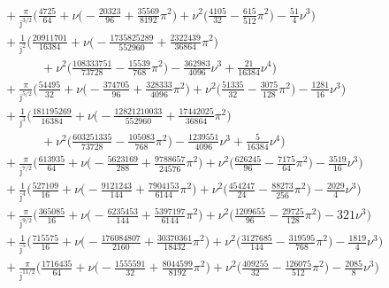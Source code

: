 \documentclass[prd,superscriptaddress,preprintnumbers,tightenlines,nofootinbib, eqsecnum]{revtex4-2}
\newcommand{\nn}{\nonumber}
\begin{document}
\begin{align}
&\qquad\quad + \frac{\pi}{\bar{\jmath}^{3/2}}\Bigg(\frac{4725}{64} + \nu\bigg(-\frac{20323}{96} + \frac{35569}{8192}\pi^{2}\bigg) + \nu^{2}\bigg(\frac{4105}{32} - \frac{615}{512}\pi^{2}\bigg) - \frac{51}{4}\nu^{3}\Bigg) \nn \\
&\qquad\quad + \frac{1}{\bar{\jmath}^{2}}\Bigg(\frac{20911701}{16384} + \nu\bigg(-\frac{1735825289}{552960} + \frac{2322439}{36864}\pi^{2}\bigg) \nn \\
&\qquad\qquad\qquad + \nu^{2}\bigg(\frac{108333751}{73728} - \frac{15539}{768}\pi^{2}\bigg) - \frac{362983}{4096}\nu^{3} + \frac{21}{16384}\nu^{4}\Bigg) \nn \\
&\qquad\quad + \frac{\pi}{\bar{\jmath}^{5/2}}\Bigg(\frac{54495}{32} + \nu\bigg(-\frac{374705}{96} + \frac{328333}{4096}\pi^{2}\bigg) + \nu^{2}\bigg(\frac{51335}{32} - \frac{3075}{128}\pi^{2}\bigg) - \frac{1281}{16}\nu^{3}\Bigg) \nn \\
&\qquad\quad + \frac{1}{\bar{\jmath}^{3}}\Bigg(\frac{181195269}{16384} + \nu\bigg(-\frac{12821210033}{552960} + \frac{17442025}{36864}\pi^{2}\bigg) \nn\\
&\qquad\qquad\qquad + \nu^{2}\bigg(\frac{603251335}{73728} - \frac{105083}{768}\pi^{2}\bigg) - \frac{1239551}{4096}\nu^{3} + \frac{5}{16384}\nu^{4}\Bigg) \nn \\
&\qquad\quad + \frac{\pi}{\bar{\jmath}^{7/2}}\Bigg(\frac{613935}{64} + \nu\bigg(-\frac{5623169}{288} + \frac{9788657}{24576}\pi^{2}\bigg) + \nu^{2}\bigg(\frac{626245}{96} - \frac{7175}{64}\pi^{2}\bigg) - \frac{3519}{16}\nu^{3}\Bigg) \nn \\
&\qquad\quad + \frac{1}{\bar{\jmath}^{4}}\Bigg(\frac{527109}{16} + \nu\bigg(-\frac{9121243}{144} + \frac{7904153}{6144}\pi^{2}\bigg) + \nu^{2}\bigg(\frac{454247}{24} - \frac{88273}{256}\pi^{2}\bigg) - \frac{2029}{4}\nu^{3}\Bigg) \nn \\
&\qquad\quad + \frac{\pi}{\bar{\jmath}^{9/2}}\Bigg(\frac{365085}{16} + \nu\bigg(-\frac{6235453}{144} + \frac{5397197}{6144}\pi^{2}\bigg) + \nu^{2}\bigg(\frac{1209655}{96} - \frac{29725}{128}\pi^{2}\bigg) - 321 \nu^{3}\Bigg) \nn \\
&\qquad\quad + \frac{1}{\bar{\jmath}^{5}}\Bigg(\frac{715575}{16} + \nu\bigg(-\frac{176084807}{2160} + \frac{30370361}{18432}\pi^{2}\bigg) + \nu^{2}\bigg(\frac{3127685}{144} - \frac{319595}{768}\pi^{2}\bigg) - \frac{1819}{4}\nu^{3}\Bigg) \nn \\
&\qquad\quad + \frac{\pi}{\bar{\jmath}^{11/2}}\Bigg(\frac{1716435}{64} + \nu\bigg(-\frac{1555591}{32} + \frac{8044599}{8192}\pi^{2}\bigg) + \nu^{2}\bigg(\frac{409255}{32} - \frac{126075}{512}\pi^{2}\bigg) - \frac{2085}{8}\nu^{3}\Bigg) \nn \\

\end{align}
\end{document}
